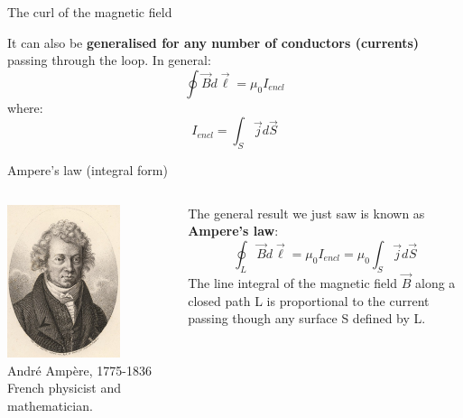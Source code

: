 \begin{frame}{The curl of the magnetic field}
\vspace{0.2cm}

It can also be {\bf generalised for any number of conductors (currents)} passing through the loop.
In general:
\begin{equation*}
    \oint \vec{B}  d\vec{\ell} = \mu_0 I_{encl}
\end{equation*}
where:
\begin{equation*}
     I_{encl} = \int_{S} \vec{j} d\vec{S}
\end{equation*}

\end{frame}

%
%
%

\begin{frame}{Ampere's law (integral form)}

\begin{columns}
  \begin{column}{0.22\textwidth}
    \begin{center}
     \includegraphics[width=0.70\textwidth]{./images/people/ampere.jpg}\\
     {\scriptsize
       Andr\'e Amp\`ere, 1775-1836\\
       French physicist and mathematician.\\
     }
    \end{center}
  \end{column}
  \begin{column}{0.78\textwidth}
     The general result we just saw is known as {\bf Ampere's law}:
     \begin{equation*}
        \oint_{L} \vec{B} d\vec{\ell} = \mu_0 I_{encl} = \mu_0 \int_{S} \vec{j} d\vec{S}
     \end{equation*}
     The line integral of the magnetic field $\vec{B}$ along a closed path L is proportional to the
     current passing though any surface S defined by L.
  \end{column}
\end{columns}


\end{frame}
